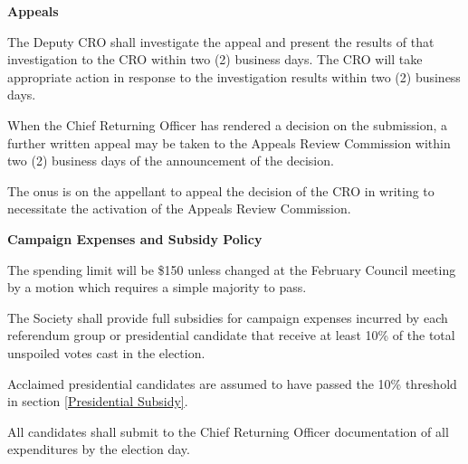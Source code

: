 \begin{longenum}[ label*=\thesection.\arabic*., align=left]
 \item \textbf{Appeals}
 \begin{longenum}[label*=\arabic*., align=left]
 \item The Deputy CRO shall investigate the appeal and present the results of that investigation to the CRO within  two (2) business days. The CRO will  take appropriate action in response  to  the investigation results within two (2) business days.
\item  When  the  Chief  Returning  Officer  has  rendered  a  decision  on  the  submission,  a  further  written appeal may be taken to the Appeals Review Commission within two (2) business days of the announcement of the decision.
\item The onus is on the appellant to appeal the decision of the CRO in writing to necessitate the activation of the Appeals Review Commission.
  \end{longenum}
  \item \textbf{Campaign Expenses and Subsidy Policy}	
  \begin{longenum}[label*=\arabic*., align=left]
  \item The spending limit will be \$150 unless changed at the February Council meeting by a motion which requires a simple majority to pass.
\item \label{Presidential Subsidy}The Society shall provide full subsidies for campaign expenses incurred by each referendum group or presidential candidate that receive at least 10\% of the total unspoiled votes cast in the election.  
			\begin{longenum}[label*=\arabic*., align=left]
			\item  Acclaimed  presidential  candidates  are  assumed  to  have  passed  the  10\%  threshold  in section \ref{Presidential Subsidy}.
			\end{longenum}
\item All candidates shall submit to the Chief Returning Officer documentation of all expenditures by the election day.
 \end{longenum}
\end{longenum}
